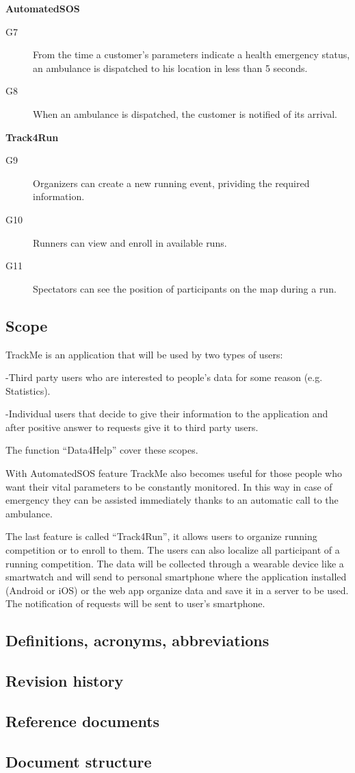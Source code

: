 \documentclass[../main.tex]{subfiles}
\begin{document}
\vspace{2mm}
{\bf AutomatedSOS}
\begin{description}
	\item [G7]  From the time a customer's parameters indicate a health emergency status, an ambulance is dispatched to his location in less than 5 seconds.
	\item [G8]  When an ambulance is dispatched, the customer is notified of its arrival.
\end{description}

\vspace{2mm}
{\bf Track4Run}
\begin{description}
	\item [G9]   Organizers can create a new running event, prividing the required information.
	\item [G10]  Runners can view and enroll in available runs.
	\item [G11]  Spectators can see the position of participants on the map during a run.
\end{description}

\vspace{8mm}
\subsection{Scope}

TrackMe is an application that will be used by two types of users:

-Third party users who are interested to people’s data for some reason (e.g. Statistics).

-Individual users that decide to give their information to the application and after positive answer to requests give it to third party users.

The function “Data4Help” cover these scopes.

With AutomatedSOS feature TrackMe also becomes useful for those people who want their vital parameters to be constantly monitored. In this way in case of emergency they can be assisted immediately thanks to an automatic call to the ambulance.

The last feature is called “Track4Run”, it allows users to organize running competition or to enroll to them. The users can also localize all participant of a running competition.
The data will be collected through a wearable device like a smartwatch and will send to personal smartphone where the application installed (Android or iOS) or the web app organize data and save it in a server to be used. The notification of requests will be sent to user’s smartphone.

\subsection{Definitions, acronyms, abbreviations}
\subsection{Revision history}
\subsection{Reference documents}
\subsection{Document structure}
\end{document}
